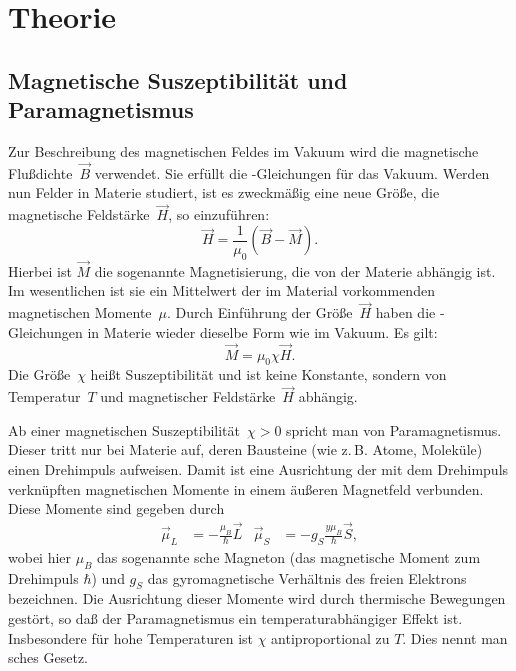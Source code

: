 
\section{Theorie}

\subsection{Magnetische Suszeptibilität und Paramagnetismus}

Zur Beschreibung des magnetischen Feldes im Vakuum wird die magnetische
Flußdichte~$\vec{B}$ verwendet.  Sie erfüllt die
-Gleichungen für das Vakuum.  Werden nun Felder in Materie
studiert, ist es zweckmäßig eine neue Größe, die magnetische
Feldstärke~$\vec{H}$, so einzuführen:
\begin{equation}
  \vec{H} = \frac{1}{\mu_0}(\vec{B} - \vec{M}).
\end{equation}
Hierbei ist $\vec{M}$ die sogenannte Magnetisierung, die von der Materie
abhängig ist.  Im wesentlichen ist sie ein Mittelwert der im Material
vorkommenden magnetischen Momente~$\mu$.  Durch Einführung der
Größe~$\vec{H}$ haben die -Gleichungen in Materie wieder
dieselbe Form wie im Vakuum.  Es gilt:
\begin{equation}
  \vec{M} = \mu_0 \chi \vec{H}.
\end{equation}
Die Größe~$\chi$ heißt Suszeptibilität und ist keine Konstante, sondern
von Temperatur~$T$ und magnetischer Feldstärke~$\vec{H}$ abhängig.

Ab einer magnetischen Suszeptibilität~$\chi>0$ spricht man von
Paramagnetismus.  Dieser tritt nur bei Materie auf, deren Bausteine (wie
z.\,B. Atome, Moleküle) einen Drehimpuls aufweisen.  Damit ist eine
Ausrichtung der mit dem Drehimpuls verknüpften magnetischen Momente in
einem äußeren Magnetfeld verbunden.  Diese Momente sind gegeben durch
\begin{align}
  \vec\mu_L &= -\frac{\mu_B}{\hbar} \vec{L} &
  \vec\mu_S &= -g_S\frac{y\mu_B}{\hbar} \vec{S},
\end{align}
wobei hier $\mu_B$ das sogenannte sche Magneton (das
magnetische Moment zum Drehimpuls $\hbar$) und $g_S$ das gyromagnetische
Verhältnis des freien Elektrons bezeichnen.  Die Ausrichtung dieser
Momente wird durch thermische Bewegungen gestört, so daß der
Paramagnetismus ein temperaturabhängiger Effekt ist.  Insbesondere für
hohe Temperaturen ist $\chi$ antiproportional zu $T$.  Dies nennt man
sches Gesetz.

